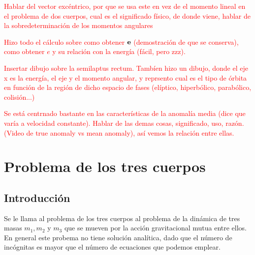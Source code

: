 \begin{Anotacion}
    \textcolor{red}{ Hablar del vector excéntrico, por que se usa este en vez de el momento lineal en el problema de dos cuerpos, cual es el significado físico, de donde viene, hablar de la sobredeterminación de los momentos angulares }
\end{Anotacion}
\begin{Anotacion}
    \textcolor{red}{Hizo todo el cálculo sobre como obtener $\mathbf{e}$ (demostración de que se conserva), como obtener $e$ y su relación con la energía (fácil, pero zzz).}
\end{Anotacion}
\begin{Anotacion}
    \textcolor{red}{Insertar dibujo sobre la semilaptus rectum. Tambíen hizo un dibujo, donde el eje x es la energía, el eje y el momento angular, y reprsento cual es el tipo de órbita en función de la región de dicho espacio de fases (elíptico, hiperbólico, parabólico, colisión...)}
\end{Anotacion}
\begin{Anotacion}
    \textcolor{red}{ Se está centrnado bastante en las características de la anomalía media (dice que varía a velocidad constante). Hablar de las demas cosas, significado, uso, razón. (Video de true anomaly vs mean anomaly), así vemos la relación entre ellas. }
\end{Anotacion}


\section{Problema de los tres cuerpos}

\subsection{Introducción}

Se le llama al problema de los tres cuerpos al problema de la dinámica de tres masas $m_1,m_2$ y $m_3$ que se mueven por la acción gravitacional mutua entre ellos. En general este probema no tiene solución analítica, dado que el número de incógnitas es mayor que el número de ecuaciones que podemos emplear. 

